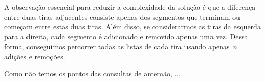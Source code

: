 \documentclass[main.tex]{subfiles}
\begin{document}
A observação essencial para reduzir a complexidade da solução é que a diferença entre duas tiras adjacentes consiste apenas dos segmentos que terminam ou começam entre estas duas tiras. Além disso, se considerarmos as tiras da esquerda para a direita, cada segmento é adicionado e removido apenas uma vez. Dessa forma, conseguimos percorrer todas as listas de cada tira usando apenas~$n$ adições e remoções.

Como não temos os pontos das consultas de antemão, ...
\end{document}
